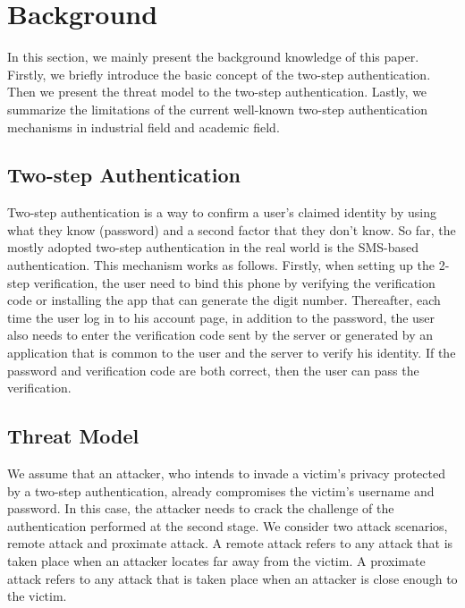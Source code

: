 \section{Background}
\label{sec:background}
In this section, we mainly present the background knowledge of this paper. Firstly, we briefly introduce the basic concept of the two-step authentication. Then we present the threat model to the two-step authentication. Lastly, we summarize the limitations of the current well-known two-step authentication mechanisms in industrial field and academic field.

\subsection{Two-step Authentication}
Two-step authentication is a way to confirm a user's claimed identity by using what they know (password) and a second factor that they don't know. So far, the mostly adopted two-step authentication in the real world is the SMS-based authentication. This mechanism works as follows. Firstly, when setting up the 2-step verification, the user need to bind this phone by verifying the verification code or installing the app that can generate the digit number. Thereafter, each time the user log in to his account page, in addition to the password, the user also needs to enter the verification code sent by the server or generated by an application that is common to the user and the server to verify his identity. If the password and verification code are both correct, then the user can pass the verification.

\subsection{Threat Model}
We assume that an attacker, who intends to invade a victim's privacy protected by a two-step authentication, already compromises the victim's username and password. In this case, the attacker needs to crack the challenge of the authentication performed at the second stage. We consider two attack scenarios, remote attack and proximate attack. A remote attack refers to any attack that is taken place when an attacker locates far away from the victim. A proximate attack refers to any attack that is taken place when an attacker is close enough to the victim. 

